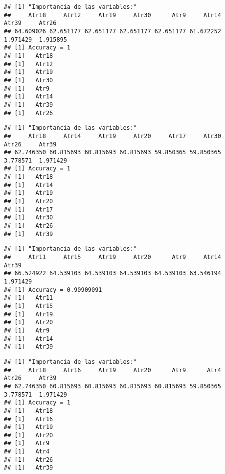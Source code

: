 \documentclass[
]{article}
\begin{document}
\begin{verbatim}
## [1] "Importancia de las variables:"
##     Atr18     Atr12     Atr19     Atr30      Atr9     Atr14     Atr39     Atr26 
## 64.609026 62.651177 62.651177 62.651177 62.651177 61.672252  1.971429  1.915895 
## [1] Accuracy = 1
## [1]   Atr18
## [1]   Atr12
## [1]   Atr19
## [1]   Atr30
## [1]   Atr9
## [1]   Atr14
## [1]   Atr39
## [1]   Atr26
\end{verbatim}

\begin{verbatim}
## [1] "Importancia de las variables:"
##     Atr18     Atr14     Atr19     Atr20     Atr17     Atr30     Atr26     Atr39 
## 62.746350 60.815693 60.815693 60.815693 59.850365 59.850365  3.778571  1.971429 
## [1] Accuracy = 1
## [1]   Atr18
## [1]   Atr14
## [1]   Atr19
## [1]   Atr20
## [1]   Atr17
## [1]   Atr30
## [1]   Atr26
## [1]   Atr39
\end{verbatim}

\begin{verbatim}
## [1] "Importancia de las variables:"
##     Atr11     Atr15     Atr19     Atr20      Atr9     Atr14     Atr39 
## 66.524922 64.539103 64.539103 64.539103 64.539103 63.546194  1.971429 
## [1] Accuracy = 0.90909091
## [1]   Atr11
## [1]   Atr15
## [1]   Atr19
## [1]   Atr20
## [1]   Atr9
## [1]   Atr14
## [1]   Atr39
\end{verbatim}

\begin{verbatim}
## [1] "Importancia de las variables:"
##     Atr18     Atr16     Atr19     Atr20      Atr9      Atr4     Atr26     Atr39 
## 62.746350 60.815693 60.815693 60.815693 60.815693 59.850365  3.778571  1.971429 
## [1] Accuracy = 1
## [1]   Atr18
## [1]   Atr16
## [1]   Atr19
## [1]   Atr20
## [1]   Atr9
## [1]   Atr4
## [1]   Atr26
## [1]   Atr39
\end{verbatim}
\end{document}
